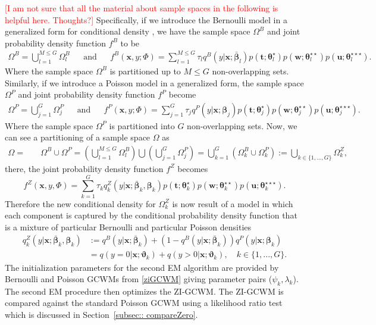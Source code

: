 \documentclass[11pt,letterpaper]{article}
\numberwithin{equation}{section}
\numberwithin{equation}{section}
\numberwithin{equation}{section}
\begin{document}
	 \textcolor{red}{[I am not sure that all the material about sample spaces in the following is helpful here. Thoughts?]} Specifically, if we introduce the Bernoulli model in a generalized form for conditional density \citep[see][]{Ingrassia+Punzo+Vittadini+Minotti:2015}, we have the sample space $\Omega^B$ and joint probability density function $f^B$ to be \begin{align*}
\Omega^B =  \bigcup_{l =1}^{M \leq G}  \Omega_l^B & & \text{and} &  &
f^B(\bm x, y; \Phi)= \sum_{l=1}^{M \leq G} \tau_l q^B(y|\bm{x}; \bm{\bar{\beta}}_l) p(\bm{t};\bm{\theta}_l^{\star})p(\bm{w};\bm{\theta}_l^{\star\star})p(\bm{u};\bm{\theta}_l^{\star\star\star}).
\end{align*}
Where the sample space $\Omega^B$ is partitioned up to $M \leq G$ non-overlapping sets.
Similarly, if we introduce a Poisson model in a generalized form, the sample space $\Omega^P$ and joint probability density function $f^P$ become
\begin{align*}
\Omega^P =  \bigcup_{j =1}^{G} \Omega_j^P & & \text{and} &  &
f^P(\bm x, y; \Phi)= \sum_{j=1}^{G} \tau_j q^P(y|\bm{x};\bm{\beta}_{j}) p(\bm{t};\bm{\theta}_j^{\star})p(\bm{w};\bm{\theta}_j^{\star\star})p(\bm{u};\bm{\theta}_j^{\star\star\star}).
\end{align*}
Where the sample space $\Omega^P$ is partitioned into  $G$ non-overlapping sets.
 Now, we can see a partitioning of a sample space $\Omega$ as
 \begin{align*}
  \Omega = & \quad \Omega^B \cup \Omega^P  =  \left(  \bigcup_{l=1}^{M\leq G} \Omega^B_l \right) \bigcup \left( \bigcup_{j=1}^G \Omega^P_j  \right) = \bigcup^G_{k = 1} \left(\Omega_k^B \cup \Omega_k^P \right) :=  \bigcup_{k \in \{ 1, ..., G  \} } \Omega_k^Z,
 \end{align*}
there, the joint probability density function $f^Z$ becomes
 $$f^Z(\bm{x},y,\Phi) = \sum_{k=1}^{G} \tau_k q^Z_{k}(y|\bm{x};  \bm{\bar{\beta}}_k,\bm{ \beta}_k)  p(\bm{t};\bm{\theta}_k^{\star})p(\bm{w};\bm{\theta}_k^{\star\star})p(\bm{u};\bm{\theta}_k^{\star\star\star}). $$  Therefore the new conditional density for $\Omega^Z_k$ is now result of a model in which each component is captured by the conditional probability density function that is a mixture of particular Bernoulli and particular Poisson densities
\begin{align}
q^Z_{k}(y|\bm{x};  \bm{\bar{\beta}}_k,\bm{ \beta}_k) & := q^B(y|\bm{x}; \bm{\bar{\beta}}_k) +(1-  q^B(y|\bm{x}; \bm{\bar{\beta}}_k) ) q^P(y|\bm{x};\bm{\beta}_k) \nonumber \\
& = q(y = 0|\bm{x};\bm{\vartheta}_{k} ) +  q(y > 0|\bm{x} ; \bm{\vartheta}_{k}), \quad k \in \{ 1, ..., G  \}.
\label{ziGCWM}
\end{align}
The initialization parameters for the second EM algorithm are provided by Bernoulli and Poisson GCWMs from \eqref{ziGCWM} giving parameter pairs ($ \psi_k,\lambda_k  $). The second EM procedure then optimizes the ZI-GCWM. The ZI-GCWM is compared against the standard Poisson GCWM using a likelihood ratio test which is discussed in Section~\ref{subsec:: compareZero}.
\end{document}
